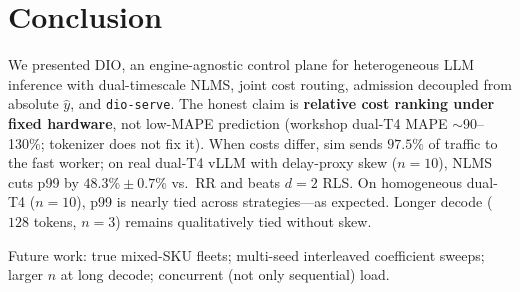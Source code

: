 \documentclass[10pt,twocolumn,letterpaper]{article}
\begin{document}

\section{Conclusion}
\label{sec:conclusion}

We presented DIO, an engine-agnostic control plane for heterogeneous LLM inference with dual-timescale NLMS, joint cost routing, admission decoupled from absolute $\hat{y}$, and \texttt{dio-serve}. The honest claim is \textbf{relative cost ranking under fixed hardware}, not low-MAPE prediction (workshop dual-T4 MAPE $\sim$90--130\%; tokenizer does not fix it). When costs differ, sim sends $97.5\%$ of traffic to the fast worker; on real dual-T4 vLLM with delay-proxy skew ($n{=}10$), NLMS cuts p99 by $48.3\%\pm0.7\%$ vs.\ RR and beats $d{=}2$ RLS. On homogeneous dual-T4 ($n{=}10$), p99 is nearly tied across strategies---as expected. Longer decode ($128$ tokens, $n{=}3$) remains qualitatively tied without skew.

Future work: true mixed-SKU fleets; multi-seed interleaved coefficient sweeps; larger $n$ at long decode; concurrent (not only sequential) load.
\end{document}
